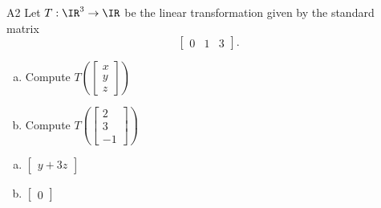 \begin{problem}{A2}
Let $T: \IR^3 \rightarrow \IR$ be the linear transformation given by the standard matrix
$$\begin{bmatrix} 0 & 1 & 3 \end{bmatrix}.$$
\begin{enumerate}[(a)]
\item Compute \( T\left( \begin{bmatrix}x\\ y \\ z  \end{bmatrix} \right) \)
\item Compute \( T\left( \begin{bmatrix} 2 \\ 3 \\ -1\end{bmatrix} \right) \)
\end{enumerate}
\end{problem}
\begin{solution}
\begin{enumerate}[(a)]
\item \(\begin{bmatrix} y+3z  \end{bmatrix}\)
\item \(\begin{bmatrix}  0 \end{bmatrix}\)
\end{enumerate}
\end{solution}

